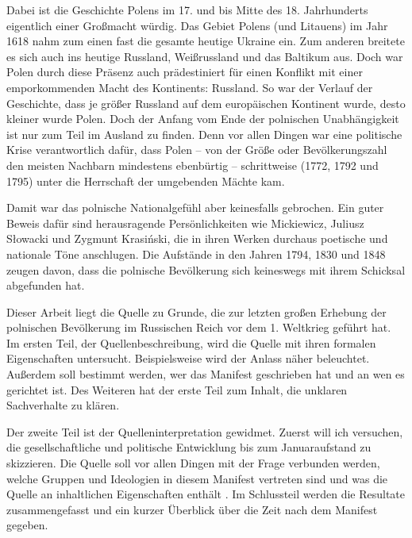 \documentclass[12pt,headsepline,a4paper]{scrartcl}
\begin{document}
Dabei ist die Geschichte Polens im 17. und bis Mitte des 18. Jahrhunderts eigentlich einer
Großmacht würdig. Das Gebiet Polens (und Litauens) im Jahr 1618 nahm zum einen fast die
gesamte heutige Ukraine ein. Zum anderen breitete es sich auch ins heutige Russland, Weißrussland
und das Baltikum aus. Doch war Polen durch diese Präsenz auch prädestiniert für einen Konflikt mit
einer emporkommenden Macht des Kontinents: Russland. So war der Verlauf der Geschichte, dass
je größer Russland auf dem europäischen Kontinent wurde, desto kleiner wurde Polen. Doch der
Anfang vom Ende der polnischen Unabhängigkeit ist nur zum Teil im Ausland zu finden. Denn vor
allen Dingen war eine politische Krise verantwortlich dafür, dass Polen – von der Größe oder
Bevölkerungszahl den meisten Nachbarn mindestens ebenbürtig – schrittweise (1772, 1792 und
1795) unter die Herrschaft der umgebenden Mächte kam.

Damit war das polnische Nationalgefühl aber keinesfalls gebrochen. Ein guter Beweis dafür sind
herausragende Persönlichkeiten wie Mickiewicz, Juliusz Słowacki und Zygmunt Krasiński, die in
ihren Werken durchaus poetische und nationale Töne anschlugen. Die Aufstände in den Jahren
1794, 1830 und 1848 zeugen davon, dass die polnische Bevölkerung sich keineswegs mit ihrem
Schicksal abgefunden hat.

Dieser Arbeit liegt die Quelle zu Grunde, die zur letzten großen Erhebung der polnischen
Bevölkerung im Russischen Reich vor dem 1. Weltkrieg geführt hat.
Im ersten Teil, der Quellenbeschreibung, wird die Quelle mit ihren formalen Eigenschaften
untersucht. Beispielsweise wird der Anlass näher beleuchtet. Außerdem soll bestimmt werden, wer
das Manifest geschrieben hat und an wen es gerichtet ist. Des Weiteren hat der erste Teil zum Inhalt,
die unklaren Sachverhalte zu klären.

Der zweite Teil ist der Quelleninterpretation gewidmet. Zuerst will ich versuchen, die
gesellschaftliche und politische Entwicklung bis zum Januaraufstand zu skizzieren. Die Quelle soll
vor allen Dingen mit der Frage verbunden werden, welche Gruppen und Ideologien in diesem
Manifest vertreten sind und was die Quelle an inhaltlichen Eigenschaften enthält .
Im Schlussteil werden die Resultate zusammengefasst und ein kurzer Überblick über die Zeit nach
dem Manifest gegeben.

\newpage
\end{document}
